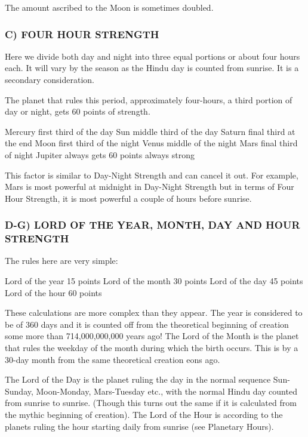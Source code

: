 The amount ascribed to the Moon is sometimes doubled.

 

\subsubsection{C) FOUR HOUR STRENGTH}

 

Here we divide both day and night into three equal portions or about four hours each. It will vary by the season as the Hindu day is counted from sunrise. It is a secondary consideration.

The planet that rules this period, approximately four-hours, a third portion of day or night, gets 60 points of strength.

 

Mercury	  first third of the day	Sun	  middle third of the day
Saturn	  final third at the end	Moon	  first third of the night
Venus	  middle of the night	Mars	  final third of night
Jupiter	  always gets 60 points		always strong
 

This factor is similar to Day-Night Strength and can cancel it out. For example, Mars is most powerful at midnight in Day-Night Strength but in terms of Four Hour Strength, it is most powerful a couple of hours before sunrise.

 

\subsubsection{D-G) LORD OF THE YEAR, MONTH, DAY AND HOUR STRENGTH}

 

The rules here are very simple:

 

Lord of the year	 15 points	Lord of the month	 30 points
Lord of the day	 45 points	Lord of the hour	 60 points
 

These calculations are more complex than they appear. The year is considered to be of 360 days and it is counted off from the theoretical beginning of creation some more than 714,000,000,000 years ago! The Lord of the Month is the planet that rules the weekday of the month during which the birth occurs. This is by a 30-day month from the same theoretical creation eons ago.

 

The Lord of the Day is the planet ruling the day in the normal sequence Sun-Sunday, Moon-Monday, Mars-Tuesday etc., with the normal Hindu day counted from sunrise to sunrise. (Though this turns out the same if it is calculated from the mythic beginning of creation). The Lord of the Hour is according to the planets ruling the hour starting daily from sunrise (see Planetary Hours).

